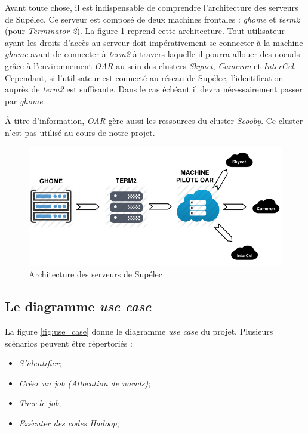 \par Avant toute chose, il est indispensable de comprendre l'architecture des serveurs de Supélec. Ce serveur est composé de deux machines frontales : \emph{ghome} et \emph{term2} (pour \emph{Terminator 2}). La figure \ref{fig:archi_serveur} reprend cette architecture. Tout utilisateur ayant les droits d'accès au serveur doit impérativement se connecter à la machine \emph{ghome} avant de connecter à \emph{term2} à travers laquelle il pourra allouer des noeuds grâce à l'environnement \emph{OAR} au sein des clusters \emph{Skynet}, \emph{Cameron} et \emph{InterCel}. Cependant, si l'utilisateur est connecté au réseau de Supélec, l'identification auprès de \emph{term2} est suffisante. Dans le cas échéant il devra nécessairement passer par \emph{ghome}.
\par À titre d'information, \emph{OAR} gère aussi les ressources du cluster \emph{Scooby}. Ce cluster n'est pas utilisé au cours de notre projet.

\begin{figure}[h!]
  \centering
  \includegraphics[width=14cm]{images/archi_serveur_supelec.png}
  \caption{Architecture des serveurs de Supélec}
  \label{fig:archi_serveur}
\end{figure}

\subsection{Le diagramme \emph{use case}}
\label{sec:le-diagramme-use}

\par La figure \ref{fig:use_case} donne le diagramme \emph{use case} du projet. Plusieurs scénarios peuvent être répertoriés :

\begin{itemize}
\item \emph{S’identifier};
\item \emph{Créer un job (Allocation de nœuds)};
\item \emph{Tuer le job};
\item \emph{Exécuter des codes Hadoop};
\end{itemize}

